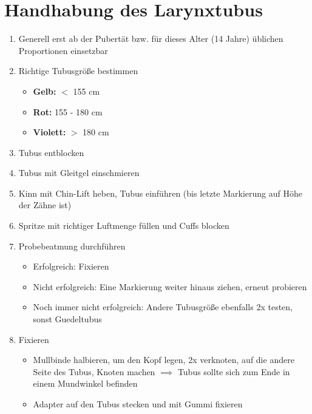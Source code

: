 \chapter{Handhabung des Larynxtubus}
\begin{enumerate}
    \item Generell erst ab der Pubertät bzw. für dieses Alter (14 Jahre) üblichen Proportionen einsetzbar
    \item Richtige Tubusgröße bestimmen
          \begin{itemize}
              \item \textbf{Gelb:} $<$ 155 cm
              \item \textbf{Rot:} 155 - 180 cm
              \item \textbf{Violett:} $>$ 180 cm
          \end{itemize}
    \item Tubus entblocken
    \item Tubus mit Gleitgel einschmieren
    \item Kinn mit Chin-Lift heben, Tubus einführen (bis letzte Markierung auf Höhe der Zähne ist)
    \item Spritze mit richtiger Luftmenge füllen und Cuffs blocken
    \item Probebeatmung durchführen
          \begin{itemize}
              \item Erfolgreich: Fixieren
              \item Nicht erfolgreich: Eine Markierung weiter hinaus ziehen, erneut probieren
              \item Noch immer nicht erfolgreich: Andere Tubusgröße ebenfalls 2x testen, sonst Guedeltubus
          \end{itemize}
    \item Fixieren
          \begin{itemize}
              \item Mullbinde halbieren, um den Kopf legen, 2x verknoten, auf die andere Seite des Tubus, Knoten machen $\implies$ Tubus sollte sich zum Ende in einem Mundwinkel befinden
              \item Adapter auf den Tubus stecken und mit Gummi fixieren
          \end{itemize}
\end{enumerate}